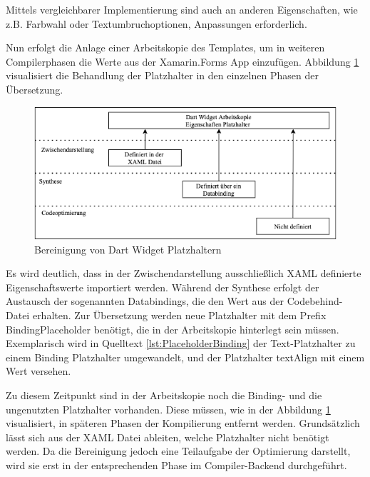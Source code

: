  

Mittels vergleichbarer Implementierung sind auch an anderen Eigenschaften,  wie z.B. Farbwahl oder Textumbruchoptionen,  Anpassungen erforderlich.

Nun erfolgt die Anlage einer Arbeitskopie des Templates,  um in weiteren Compilerphasen die Werte aus der Xamarin.Forms App einzufügen.  Abbildung \ref{fig:PlaceholderOptions} visualisiert die Behandlung der Platzhalter in den einzelnen Phasen der Übersetzung.


\begin{figure}[!ht]
 \includegraphics[width=\textwidth,keepaspectratio]{Images/Implementation/DartPlaceHolder.png}
 \caption{Bereinigung von Dart Widget Platzhaltern}
 \label{fig:PlaceholderOptions}
\end{figure}

Es wird deutlich, dass in der Zwischendarstellung ausschließlich XAML definierte Eigenschaftswerte 
importiert werden.  Während der Synthese erfolgt der Austausch der sogenannten Databindings, die den Wert aus der Codebehind-Datei erhalten.  Zur Übersetzung werden neue Platzhalter mit dem Prefix \glq BindingPlaceholder\grq{} benötigt,  die in der Arbeitskopie hinterlegt sein müssen. Exemplarisch wird in Quelltext  \ref{lst:PlaceholderBinding} der Text-Platzhalter zu einem Binding Platzhalter umgewandelt, und der Platzhalter textAlign mit einem Wert versehen. 

 

Zu diesem Zeitpunkt sind in der Arbeitskopie noch die Binding- und die ungenutzten Platzhalter vorhanden.  Diese müssen, wie in der Abbildung \ref{fig:PlaceholderOptions} visualisiert,  in späteren Phasen der Kompilierung entfernt werden.  Grundsätzlich lässt sich aus der XAML Datei ableiten,  welche Platzhalter nicht benötigt werden.  Da die Bereinigung jedoch eine Teilaufgabe der Optimierung darstellt, wird sie erst in der entsprechenden Phase im Compiler-Backend durchgeführt. 

